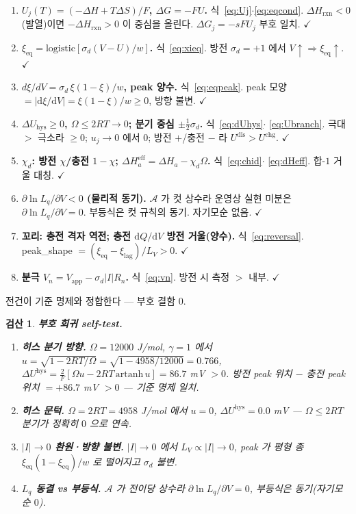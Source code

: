 \documentclass[11pt,a4paper]{article}
\newtheorem*{verifybox}{검산}
\newcommand{\dd}{\mathrm{d}}
\newcommand{\eff}{\mathrm{eff}}
\newcommand{\eq}{\mathrm{eq}}
\newcommand{\app}{\mathrm{app}}
\newcommand{\rxn}{\mathrm{rxn}}
\newcommand{\dis}{\mathrm{dis}}
\newcommand{\chg}{\mathrm{chg}}
\newcommand{\hys}{\mathrm{hys}}
\begin{document}
\begin{enumerate}[label=\textbf{S\arabic*.},leftmargin=2.6em,itemsep=2pt]
\item \textbf{$U_j(T)=(-\Delta H+T\Delta S)/F$, $\Delta G=-FU$.} 식~\eqref{eq:Uj}$\cdot$\eqref{eq:eqcond}.
$\Delta H_\rxn<0$(발열)이면 $-\Delta H_\rxn>0$ 이 중심을 올린다. $\Delta G_j=-sFU_j$ 부호 일치. $\checkmark$
\item \textbf{$\xi_\eq=\mathrm{logistic}[\sigma_d(V-U)/w]$.} 식~\eqref{eq:xieq}. 방전 $\sigma_d=+1$ 에서
$V\!\uparrow\Rightarrow\xi_\eq\!\uparrow$. $\checkmark$
\item \textbf{$d\xi/dV=\sigma_d\,\xi(1-\xi)/w$, peak 양수.} 식~\eqref{eq:eqpeak}. peak 모양 $=|\dd\xi/\dd V|=
\xi(1-\xi)/w\ge0$, 방향 불변. $\checkmark$
\item \textbf{$\Delta U_\hys\ge0$, $\Omega\le2RT\to0$; 분기 중심 $\pm\tfrac12\sigma_d$.} 식~\eqref{eq:dUhys}$\cdot$
\eqref{eq:Ubranch}. 극대 $>$ 극소라 $\ge0$; $u_j\to0$ 에서 $0$; 방전 $+$/충전 $-$ 라 $U^\dis>U^\chg$. $\checkmark$
\item \textbf{$\chi_d$: 방전 $\chi$/충전 $1-\chi$; $\Delta H_a^\eff=\Delta H_a-\chi_d\Omega$.} 식~\eqref{eq:chid}$\cdot$
\eqref{eq:dHeff}. 합-$1$ 거울 대칭. $\checkmark$
\item \textbf{$\partial\ln L_q/\partial V<0$ (물리적 동기).} $\mathcal A$ 가 컷 상수라 운영상 실현 미분은
$\partial\ln L_q/\partial V=0$. 부등식은 컷 규칙의 동기. 자기모순 없음. $\checkmark$
\item \textbf{꼬리: 충전 격자 역전; 충전 $\dd Q/\dd V$ 방전 거울(양수).} 식~\eqref{eq:reversal}.
peak\_shape $=(\xi_\eq-\xi_\mathrm{lag})/L_V>0$. $\checkmark$
\item \textbf{분극 $V_n=V_\app-\sigma_d|I|R_n$.} 식~\eqref{eq:vn}. 방전 시 측정 $>$ 내부. $\checkmark$
\end{enumerate}
전건이 기준 명제와 정합한다 — 부호 결함 $0$.

\begin{verifybox}
\textbf{부호 회귀 self-test.}
\begin{enumerate}[label=\textbf{R\arabic*.},leftmargin=2.6em,itemsep=1pt]
\item \textbf{히스 분기 방향.} $\Omega=12000$ J/mol, $\gamma=1$ 에서
$u=\sqrt{1-2RT/\Omega}=\sqrt{1-4958/12000}=0.766$,
$\Delta U^\hys=\frac{2}{F}[\Omega u-2RT\,\mathrm{artanh}\,u]=86.7$ mV $>0$.
방전 peak 위치 $-$ 충전 peak 위치 $= +86.7$ mV $>0$ — 기준 명제 일치.
\item \textbf{히스 문턱.} $\Omega=2RT=4958$ J/mol 에서 $u=0$,
$\Delta U^\hys=0.0$ mV — $\Omega\le2RT$ 분기가 정확히 $0$ 으로 연속.
\item \textbf{$|I|\!\to\!0$ 환원·방향 불변.} $|I|\to0$ 에서 $L_V\propto|I|\to0$,
peak 가 평형 종 $\xi_\eq(1-\xi_\eq)/w$ 로 떨어지고 $\sigma_d$ 불변.
\item \textbf{$L_q$ 동결 vs 부등식.} $\mathcal A$ 가 전이당 상수라 $\partial\ln L_q/\partial V=0$,
부등식은 동기(자기모순 $0$).
\end{enumerate}
\end{verifybox}
\end{document}
